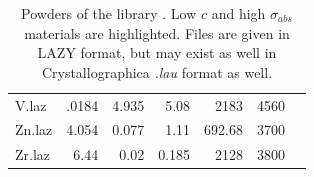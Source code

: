\begin{table}
\begin{center}
{\begin{small}
\begin{tabular}{|l|rrr|rr|p{}|}
V.laz              & .0184     & 4.935    &5.08      &2183      &4560&\\
Zn.laz             & 4.054     & 0.077    &1.11      &692.68    &3700&\\
Zr.laz             & 6.44      & 0.02     &0.185     &2128      &3800&\\
      \hline
    \end{tabular}\end{small}
    \caption{Powders of the \MCS library \cite{icsd_ill,ILLblue}. Low $c$ and high $\sigma_{abs}$ materials are highlighted. Files are given in LAZY format, but may exist as well in Crystallographica \textit{.lau} format as well.}
    \label{t:powders-data}
    }
  \end{center}
\end{table}

